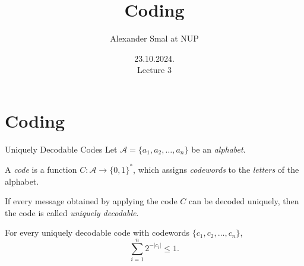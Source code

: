 \documentclass[aspectratio=169]{beamer}
\title{Coding}
\author{Alexander Smal at NUP}
\date{23.10.2024.\\ Lecture 3}
\newcommand{\bits}{\{0,1\}}
\newcommand{\bitstr}{\bits^*}
\newcommand{\seqn}[2]{{#1}_1,{#1}_2,\dotsc,{#1}_{#2}}
\begin{document}
    \begin{frame}[plain]
        \maketitle
    \end{frame}

    \section{Coding}
    \begin{frame}{Uniquely Decodable Codes}
        Let $\mathcal{A} = \{\seqn{a}{n}\}$ be an \emph{alphabet}.
        \begin{definition}
            A \emph{code} is a function \(C:\mathcal{A}\to\bitstr\),
            which assigns \emph{codewords} to the \emph{letters} of the alphabet.

            If every message obtained by applying the code \(C\) can be decoded
            uniquely, then the code is called \emph{uniquely decodable}.
        \end{definition}

        \begin{theorem}\label{thm:mcmill}
            For every uniquely decodable code with codewords
            \(\{\seqn{c}{n}\}\),
            \[
            \sum_{i=1}^{n} 2^{-|c_i|} \le 1.
            \]
        \end{theorem}
    \end{frame}
\end{document}
